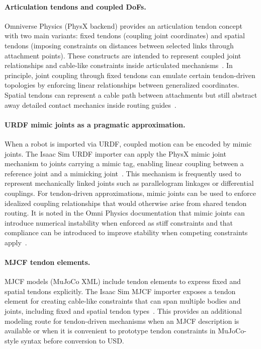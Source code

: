 \paragraph{Articulation tendons and coupled \acp{DoF}.}
Omniverse Physics (PhysX backend) provides an articulation tendon concept with two main variants: fixed tendons (coupling joint coordinates) and spatial tendons (imposing constraints on distances between selected links through attachment points). These constructs are intended to represent coupled joint relationships and cable-like constraints inside articulated mechanisms~\cite{omni_physics_articulations_tendons}. In principle, joint coupling through fixed tendons can emulate certain tendon-driven topologies by enforcing linear relationships between generalized coordinates. Spatial tendons can represent a cable path between attachments but still abstract away detailed contact mechanics inside routing guides~\cite{omni_physics_articulations_tendons}.

\paragraph{URDF mimic joints as a pragmatic approximation.}
When a robot is imported via \ac{URDF}, coupled motion can be encoded by mimic joints. The Isaac Sim \ac{URDF} importer can apply the PhysX mimic joint mechanism to joints carrying a mimic tag, enabling linear coupling between a reference joint and a mimicking joint~\cite{isaacsim_urdf_importer}. This mechanism is frequently used to represent mechanically linked joints such as parallelogram linkages or differential couplings. For tendon-driven approximations, mimic joints can be used to enforce idealized coupling relationships that would otherwise arise from shared tendon routing. It is noted in the Omni Physics documentation that mimic joints can introduce numerical instability when enforced as stiff constraints and that compliance can be introduced to improve stability when competing constraints apply~\cite{omni_physics_articulations_tendons}.

\paragraph{MJCF tendon elements.}
\ac{MJCF} models (MuJoCo XML) include tendon elements to express fixed and spatial tendons explicitly. The Isaac Sim \ac{MJCF} importer exposes a tendon element for creating cable-like constraints that can span multiple bodies and joints, including fixed and spatial tendon types~\cite{isaacsim_mjcf_tendon_api}. This provides an additional modeling route for tendon-driven mechanisms when an \ac{MJCF} description is available or when it is convenient to prototype tendon constraints in MuJoCo-style syntax before conversion to \ac{USD}.

